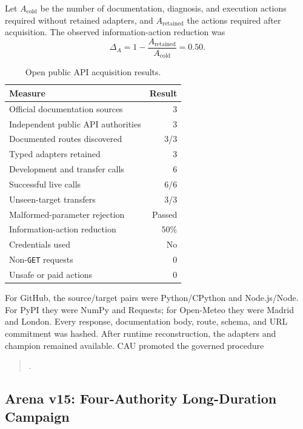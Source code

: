 Let $A_{\mathrm{cold}}$ be the number of documentation, diagnosis, and execution
actions required without retained adapters, and $A_{\mathrm{retained}}$ the
actions required after acquisition.  The observed information-action reduction
was
\begin{equation}
 \Delta_A=1-\frac{A_{\mathrm{retained}}}{A_{\mathrm{cold}}}=0.50.
\end{equation}

\begin{table}[htbp]
\centering
\caption{Open public API acquisition results.}
\label{tab:open-public-api-results}
\begin{tabular}{lr}
\hline
Measure & Result \\
\hline
Official documentation sources & 3 \\
Independent public API authorities & 3 \\
Documented routes discovered & 3/3 \\
Typed adapters retained & 3 \\
Development and transfer calls & 6 \\
Successful live calls & 6/6 \\
Unseen-target transfers & 3/3 \\
Malformed-parameter rejection & Passed \\
Information-action reduction & $50\%$ \\
Credentials used & No \\
Non-\texttt{GET} requests & 0 \\
Unsafe or paid actions & 0 \\
\hline
\end{tabular}
\end{table}

For GitHub, the source/target pairs were Python/CPython and Node.js/Node.  For
PyPI they were NumPy and Requests; for Open-Meteo they were Madrid and London.
Every response, documentation body, route, schema, and URL commitment was
hashed.  After runtime reconstruction, the adapters and champion remained
available.  CAU promoted the governed procedure
\begin{quote}
\small{}.
\end{quote}

\subsection{Arena v15: Four-Authority Long-Duration Campaign}
\label{subsec:v15-four-authority-expansion}

